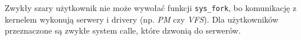 Zwykły szary użytkownik nie może wywołać funkcji \texttt{sys\_fork}, bo komunikację z kernelem wykonują serwery i drivery (np. \textit{PM} czy \textit{VFS}). Dla użytkowników przeznaczone są zwykłe system calle, które dzwonią do serwerów.
